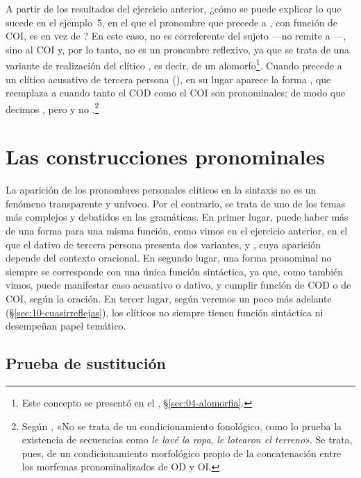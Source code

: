A partir de los resultados del ejercicio anterior, ¿cómo se puede explicar lo que
sucede en el ejemplo~5, en el que el pronombre que precede a , con
función de COI, es  en vez de ? En este caso,  no
es correferente del sujeto ---no remite a ---, sino al COI  y, por lo tanto, no es un pronombre reflexivo, ya que se trata de
una variante de realización del clítico , es decir, de un
alomorfo\footnote{Este concepto se presentó en el ,
§\ref{sec:04-alomorfia}.}. Cuando  precede a un clítico acusativo de
tercera persona (), en su lugar aparece la forma
, que reemplaza a  cuando tanto el COD como el COI son
pronominales; de modo que decimos , pero
 y no .\footnote{Según \textcite[173, n.~9]{ditullio2014}, «No se trata de un
condicionamiento fonológico, como lo prueba la existencia de secuencias como
\textit{le lavé la ropa}, \textit{le lotearon el terreno}». Se trata, pues, de un
condicionamiento morfológico propio de la concatenación entre los morfemas
pronominalizados de OD y OI.}

\section{Las construcciones pronominales}\label{sec:10-construcciones}

La aparición de los pronombres personales clíticos en la sintaxis no es un
fenómeno transparente y unívoco. Por el contrario, se trata de uno de los temas
más complejos y debatidos en las gramáticas. En primer lugar, puede haber más de
una forma para una misma función, como vimos en el ejercicio anterior, en el que
el dativo de tercera persona presenta dos variantes,  y ,
cuya aparición depende del contexto oracional. En segundo lugar, una forma
pronominal no siempre se corresponde con una única función sintáctica, ya que,
como también vimos, puede manifestar caso acusativo o dativo, y cumplir función
de COD o de COI, según la oración. En tercer lugar, según veremos un poco más
adelante (§\ref{sec:10-cuasirreflejas}), los clíticos no siempre tienen función
sintáctica ni desempeñan papel temático.

\subsection{Prueba de sustitución}\label{sec:10-sustitucion}

